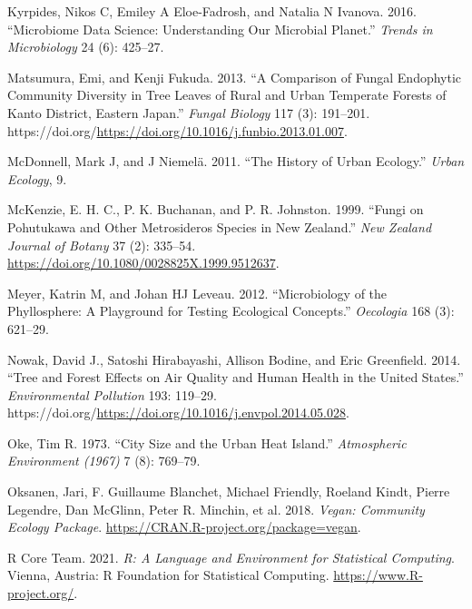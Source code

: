 \documentclass[fleqn,10pt,lineno]{wlpeerj} %
\newlength{\cslhangindent}
\newenvironment{CSLReferences}[2] %
 {%
  \setlength{\parindent}{0pt}
  \ifodd #1 \everypar{\setlength{\hangindent}{\cslhangindent}}\ignorespaces\fi
  \ifnum #2 > 0
  \setlength{\parskip}{#2\baselineskip}
  \fi
 }%
 {}
\begin{document}
\begin{CSLReferences}{1}{0}
\leavevmode{}%
Kyrpides, Nikos C, Emiley A Eloe-Fadrosh, and Natalia N Ivanova. 2016. {``Microbiome Data Science: Understanding Our Microbial Planet.''} \emph{Trends in Microbiology} 24 (6): 425--27.

\leavevmode{}%
Matsumura, Emi, and Kenji Fukuda. 2013. {``A Comparison of Fungal Endophytic Community Diversity in Tree Leaves of Rural and Urban Temperate Forests of Kanto District, Eastern Japan.''} \emph{Fungal Biology} 117 (3): 191--201. https://doi.org/\url{https://doi.org/10.1016/j.funbio.2013.01.007}.

\leavevmode{}%
McDonnell, Mark J, and J Niemelä. 2011. {``The History of Urban Ecology.''} \emph{Urban Ecology}, 9.

\leavevmode{}%
McKenzie, E. H. C., P. K. Buchanan, and P. R. Johnston. 1999. {``Fungi on Pohutukawa and Other Metrosideros Species in New Zealand.''} \emph{New Zealand Journal of Botany} 37 (2): 335--54. \url{https://doi.org/10.1080/0028825X.1999.9512637}.

\leavevmode{}%
Meyer, Katrin M, and Johan HJ Leveau. 2012. {``Microbiology of the Phyllosphere: A Playground for Testing Ecological Concepts.''} \emph{Oecologia} 168 (3): 621--29.

\leavevmode{}%
Nowak, David J., Satoshi Hirabayashi, Allison Bodine, and Eric Greenfield. 2014. {``Tree and Forest Effects on Air Quality and Human Health in the United States.''} \emph{Environmental Pollution} 193: 119--29. https://doi.org/\url{https://doi.org/10.1016/j.envpol.2014.05.028}.

\leavevmode{}%
Oke, Tim R. 1973. {``City Size and the Urban Heat Island.''} \emph{Atmospheric Environment (1967)} 7 (8): 769--79.

\leavevmode{}%
Oksanen, Jari, F. Guillaume Blanchet, Michael Friendly, Roeland Kindt, Pierre Legendre, Dan McGlinn, Peter R. Minchin, et al. 2018. \emph{Vegan: Community Ecology Package}. \url{https://CRAN.R-project.org/package=vegan}.

\leavevmode{}%
R Core Team. 2021. \emph{R: A Language and Environment for Statistical Computing}. Vienna, Austria: R Foundation for Statistical Computing. \url{https://www.R-project.org/}.


\end{CSLReferences}
\end{document}

